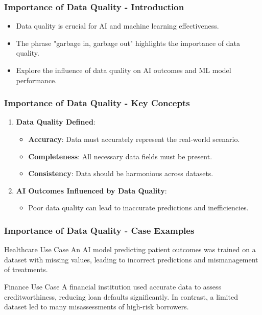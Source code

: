 \documentclass[aspectratio=169]{beamer}
\begin{document}
\begin{frame}[fragile]
    \frametitle{Importance of Data Quality - Introduction}
    \begin{itemize}
        \item Data quality is crucial for AI and machine learning effectiveness.
        \item The phrase "garbage in, garbage out" highlights the importance of data quality.
        \item Explore the influence of data quality on AI outcomes and ML model performance.
    \end{itemize}
\end{frame}

\begin{frame}[fragile]
    \frametitle{Importance of Data Quality - Key Concepts}
    \begin{enumerate}
        \item \textbf{Data Quality Defined}:
        \begin{itemize}
            \item \textbf{Accuracy}: Data must accurately represent the real-world scenario.
            \item \textbf{Completeness}: All necessary data fields must be present.
            \item \textbf{Consistency}: Data should be harmonious across datasets.
        \end{itemize}

        \item \textbf{AI Outcomes Influenced by Data Quality}:
        \begin{itemize}
            \item Poor data quality can lead to inaccurate predictions and inefficiencies.
        \end{itemize}
    \end{enumerate}
\end{frame}

\begin{frame}[fragile]
    \frametitle{Importance of Data Quality - Case Examples}
    \begin{block}{Healthcare Use Case}
        An AI model predicting patient outcomes was trained on a dataset with missing values, leading to incorrect predictions and mismanagement of treatments.
    \end{block}
    
    \begin{block}{Finance Use Case}
        A financial institution used accurate data to assess creditworthiness, reducing loan defaults significantly. In contrast, a limited dataset led to many misassessments of high-risk borrowers.
    \end{block}
\end{frame}
\end{document}
